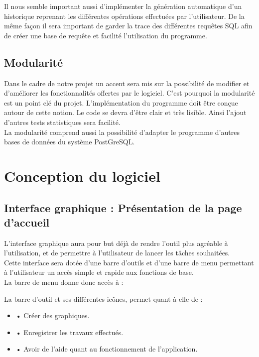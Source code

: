 \documentclass[a4paper,10pt]{report}
\begin{document}
Il nous semble important aussi d'implémenter la génération automatique d'un historique reprenant les différentes opérations effectuées par l'utilisateur. De la même façon il sera important de garder la trace des différentes requêtes SQL afin de créer une base de requête et facilité l'utilisation du programme.

\subsection{Modularité}

Dans le cadre de notre projet un accent sera mis sur la possibilité de modifier et d'améliorer les fonctionnalités offertes par le logiciel. C'est pourquoi la modularité est un point clé du projet. L'implémentation du programme doit être conçue autour de cette notion. Le code se devra d'être clair et très lisible. Ainsi l'ajout d'autres tests statistiques sera facilité. \\

La modularité comprend aussi la possibilité d'adapter le programme d'autres bases de données du système PostGreSQL.


\section{Conception du logiciel}

\subsection{Interface graphique : Présentation de la page d'accueil}

L'interface graphique aura pour but déjà de rendre l'outil plus agréable à l'utilisation, et de permettre à l'utilisateur de lancer les tâches souhaitées.\\

Cette interface sera dotée d'une barre d'outils et d’une barre de menu permettant à l'utilisateur un accès simple et rapide aux fonctions de base. \\

La barre de menu donne donc accès à :

La barre d’outil et ses différentes icônes, permet quant à elle de :

\begin{itemize}

\item • Créer des graphiques.

\item • Enregistrer les travaux effectués.

\item • Avoir de l'aide quant au fonctionnement de l'application.

\end{itemize}
\end{document}
